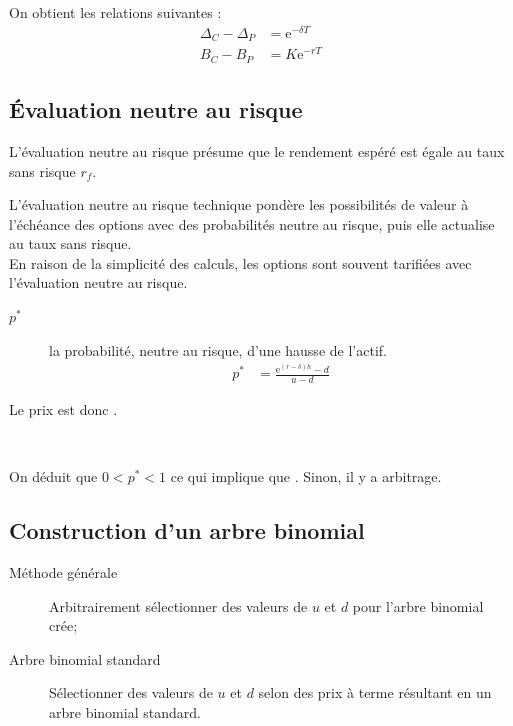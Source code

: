 \documentclass[10pt, french]{article}
\begin{document}
\begin{multicols*}{2}
On obtient les relations suivantes :
\begin{align*}
	\Delta_{C}	-	\Delta_{P}
	&=	\textrm{e}^{-\delta T}	\\
	B_{C}	-	B_{P}
	&=	K\textrm{e}^{-r T}
\end{align*}


\columnbreak
\subsection{Évaluation neutre au risque}
L'évaluation neutre au risque présume que le rendement espéré est égale au taux sans risque $r_{f}$.

\begin{rappel_enhanced}[Contexte]
L'évaluation neutre au risque technique pondère les possibilités de valeur à l'échéance des options avec des probabilités neutre au risque, puis elle actualise au taux sans risque. \\

En raison de la simplicité des calculs, les options sont souvent tarifiées avec l'évaluation neutre au risque.
\end{rappel_enhanced}


\begin{distributions}[Notation]
\begin{description}
	\item[$p^{\ast}$]	la probabilité, neutre au risque, d'une hausse de l'actif.
		\begin{align*}
		p^{\ast}	&=	\frac{\textrm{e}^{(r - \delta)h} - d}{u - d}
		\end{align*}
\end{description}
\end{distributions}

Le prix est donc .

\

On déduit que $0 < p^{\ast} < 1$ ce qui implique que . Sinon, il y a arbitrage.


\columnbreak
\subsection{Construction d'un arbre binomial}

\begin{description}
	\item[Méthode générale]	Arbitrairement sélectionner des valeurs de $u$ et $d$ pour l'arbre binomial crée;
	\item[Arbre binomial standard]	Sélectionner des valeurs de $u$ et $d$ selon des prix à terme résultant en un arbre binomial standard.
\end{description}


\end{multicols*}
\end{document}
